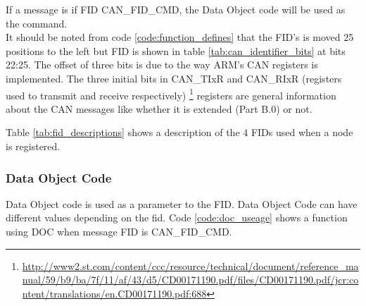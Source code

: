 If a message is if FID CAN\_FID\_CMD, the Data Object code will be used as the command.\\
It should be noted from code \ref{code:function_defines} that the FID's is moved 25 positions to the left but FID is shown in table \ref{tab:can_identifier_bits} at bits 22:25. 
The offset of three bits is due to the way ARM's CAN registers is implemented. The three initial bits in CAN\_TIxR and CAN\_RIxR (registers used to transmit and receive respectively) \footnote{\url{http://www2.st.com/content/ccc/resource/technical/document/reference_manual/59/b9/ba/7f/11/af/43/d5/CD00171190.pdf/files/CD00171190.pdf/jcr:content/translations/en.CD00171190.pdf:688}} registers are general information about the CAN messages like whether it is extended (Part B.0) or not.
\begin{table}[H]
\centering
\caption{Descriptions of the FIDs mentioned in code \ref{code:function_defines}}
\label{tab:fid_descriptions}
\end{table}

Table \ref{tab:fid_descriptions} shows a description of the 4 FIDs used when a node is registered. 

\subsubsection*{Data Object Code}
Data Object code is used as a parameter to the FID. Data Object Code can have different values depending on the fid. Code \ref{code:doc_useage} shows a function using DOC when message FID is CAN\_FID\_CMD.

